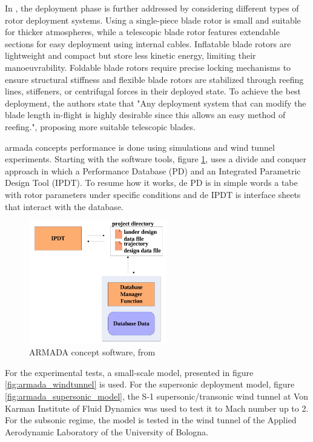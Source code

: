In \cite{noauthor_armada_nodate}, the deployment phase is further addressed by considering different types of rotor deployment systems. Using a single-piece blade rotor is small and suitable for thicker atmospheres, while a telescopic blade rotor features extendable sections for easy deployment using internal cables. Inflatable blade rotors are lightweight and compact but store less kinetic energy, limiting their manoeuvrability. Foldable blade rotors require precise locking mechanisms to ensure structural stiffness and flexible blade rotors are stabilized through reefing lines, stiffeners, or centrifugal forces in their deployed state. To achieve the best deployment, the authors state that "Any deployment system that can modify the blade length in-flight is highly desirable since this allows an easy method of reefing.", proposing more suitable telescopic blades.

\gls{armada} concepts performance is done using simulations and wind tunnel experiments. Starting with the software tools, figure \ref{fig:armada_software}, uses a divide and conquer approach in which a Performance Database (PD) and an Integrated Parametric Design  Tool (IPDT). To resume how it works, de PD is in simple words a tabe with rotor parameters under specific conditions and de IPDT is interface sheets that interact with the database.

\begin{figure}[!htb]
    \centering
    \includegraphics[width=6cm]{Figures/introduction/armada_software.png}
    \caption{ARMADA concept software, from \cite{noauthor_armada_nodate} }
    \label{fig:armada_software}
\end{figure}

For the experimental tests, a small-scale model, presented in figure \ref{fig:armada_windtunnel} is used. For the supersonic deployment model, figure \ref{fig:armada_supersonic_model}, the S-1 supersonic/transonic wind tunnel 
at Von Karman Institute of Fluid Dynamics was used to test it to Mach number up to 2. For the subsonic regime, the model is tested in the wind tunnel of the Applied Aerodynamic Laboratory of the University of Bologna.

